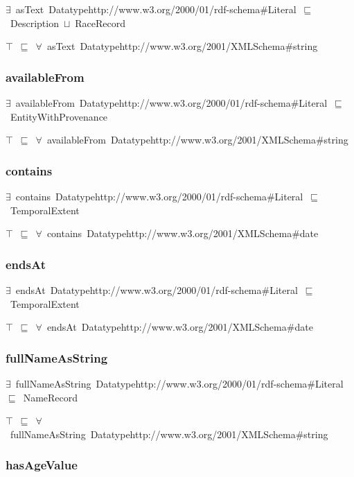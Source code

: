 \documentclass{article}
\begin{document}
\ensuremath{\exists}~asText~Datatypehttp://www.w3.org/2000/01/rdf-schema#Literal~\ensuremath{\sqsubseteq}~Description~\ensuremath{\sqcup}~RaceRecord

\ensuremath{\top}~\ensuremath{\sqsubseteq}~\ensuremath{\forall}~asText~Datatypehttp://www.w3.org/2001/XMLSchema#string

\subsubsection*{availableFrom}

\ensuremath{\exists}~availableFrom~Datatypehttp://www.w3.org/2000/01/rdf-schema#Literal~\ensuremath{\sqsubseteq}~EntityWithProvenance

\ensuremath{\top}~\ensuremath{\sqsubseteq}~\ensuremath{\forall}~availableFrom~Datatypehttp://www.w3.org/2001/XMLSchema#string

\subsubsection*{contains}

\ensuremath{\exists}~contains~Datatypehttp://www.w3.org/2000/01/rdf-schema#Literal~\ensuremath{\sqsubseteq}~TemporalExtent

\ensuremath{\top}~\ensuremath{\sqsubseteq}~\ensuremath{\forall}~contains~Datatypehttp://www.w3.org/2001/XMLSchema#date

\subsubsection*{endsAt}

\ensuremath{\exists}~endsAt~Datatypehttp://www.w3.org/2000/01/rdf-schema#Literal~\ensuremath{\sqsubseteq}~TemporalExtent

\ensuremath{\top}~\ensuremath{\sqsubseteq}~\ensuremath{\forall}~endsAt~Datatypehttp://www.w3.org/2001/XMLSchema#date

\subsubsection*{fullNameAsString}

\ensuremath{\exists}~fullNameAsString~Datatypehttp://www.w3.org/2000/01/rdf-schema#Literal~\ensuremath{\sqsubseteq}~NameRecord

\ensuremath{\top}~\ensuremath{\sqsubseteq}~\ensuremath{\forall}~fullNameAsString~Datatypehttp://www.w3.org/2001/XMLSchema#string

\subsubsection*{hasAgeValue}
\end{document}
